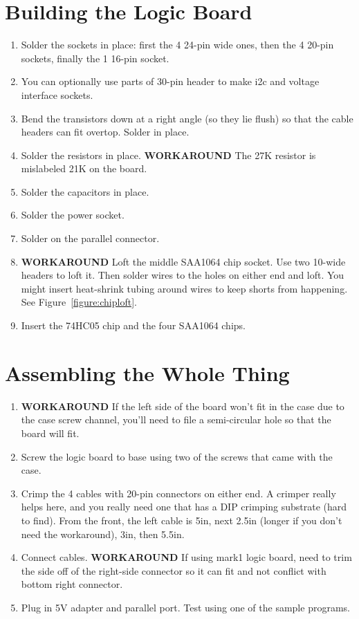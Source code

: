 \documentclass[11pt]{article}
\begin{document}
\section{Building the Logic Board}
\begin{enumerate}
\item Solder the sockets in place:  first the 4 24-pin wide ones, then
      the 4 20-pin sockets, finally the 1 16-pin socket.
\item You can optionally use parts of 30-pin header to make i2c and voltage
      interface sockets.
\item Bend the transistors down at a right angle (so they lie flush) 
      so that the cable headers can fit overtop.  Solder in place.
\item Solder the resistors in place.  
      {\bf WORKAROUND} The 27K resistor is mislabeled
      21K on the board.
\item Solder the capacitors in place.
\item Solder the power socket.
\item Solder on the parallel connector.
\item {\bf WORKAROUND} Loft the middle SAA1064 chip socket.  Use two 10-wide
      headers to loft it.  Then solder wires to the holes on either
      end and loft.  You might insert heat-shrink tubing around wires
      to keep shorts from happening.  See Figure~\ref{figure:chiploft}.
\item Insert the 74HC05 chip and the four SAA1064 chips.

\end{enumerate}

\pagebreak

\section{Assembling the Whole Thing}
\begin{enumerate}
\item {\bf WORKAROUND} If the left side of the board won't fit in the
      case due to the case screw channel, you'll need to file a 
      semi-circular hole so that the board will fit.
\item Screw the logic board to base using two of the screws that
      came with the case.
\item Crimp the 4 cables with 20-pin connectors on either end.
      A crimper really helps here, and you really need one that
      has a DIP crimping substrate (hard to find).
      From the front, the left cable is 5in, next 2.5in (longer
      if you don't need the workaround), 3in, then 5.5in.      
\item Connect cables.  {\bf WORKAROUND}  If using mark1 logic board,
      need to trim the side off of the right-side connector
      so it can fit and not conflict with bottom right connector.
\item Plug in 5V adapter and parallel port.  Test using one
      of the sample programs.
\end{enumerate}
\end{document}

